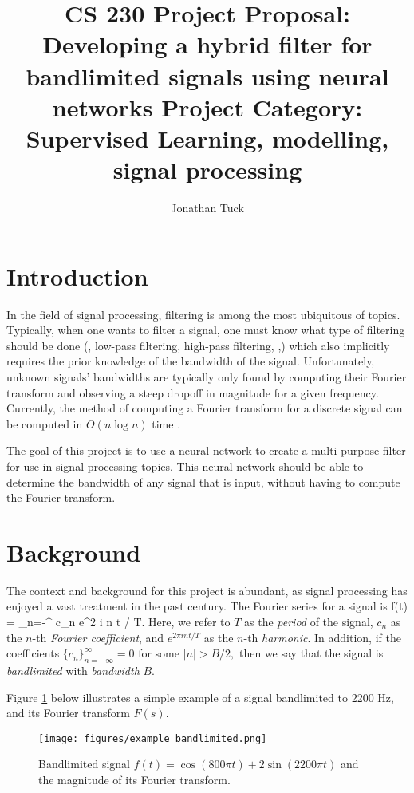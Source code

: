 \documentclass[12pt]{article}
\title{
CS 230 Project Proposal: Developing a hybrid filter for bandlimited signals using neural networks
\newline 
\newline
Project Category: Supervised Learning, modelling, signal processing
}
\author{Jonathan Tuck}
\begin{document}
\maketitle

\newpage
\tableofcontents
\newpage

\section{Introduction}
In the field of signal processing, filtering is among the most ubiquitous of topics.
Typically, when one wants to filter a signal, one must know what type of filtering should be done
(\ie, low-pass filtering, high-pass filtering, \etc,) which also implicitly
requires the prior knowledge of the bandwidth of the signal. Unfortunately, unknown
signals' bandwidths are typically only found by computing their Fourier transform and observing
a steep dropoff in magnitude for a given frequency. Currently, the method of computing a Fourier transform
for a discrete signal can be computed in $O(n \log n)$ time \cite{B:78,O:17}.

The goal of this project is to use a neural network to create a multi-purpose filter for use in
signal processing topics. This neural network should be able to determine the bandwidth of any signal
that is input, without having to compute the Fourier transform.

\section{Background}
The context and background for this project is abundant, as signal processing has enjoyed a vast treatment
in the past century. The Fourier series for a signal \cite{B:78,O:17} is
\BEQ
f(t) = \sum_{n=-\infty}^{\infty} c_n e^{2 \pi i n t / T}.
\EEQ
Here, we refer to $T$ as the \textit{period} of the signal, $c_n$ as the $n$-th 
\textit{Fourier coefficient}, and $e^{2 \pi i n t / T}$ as the $n$-th \textit{harmonic}.
In addition, if the coefficients 
$\{c_n\}_{n=-\infty}^{\infty} = 0$ for some $|n| > B/2,$ then we say that the signal is 
\textit{bandlimited} with \textit{bandwidth} $B.$

Figure \ref{f-example_bandlimited} below illustrates a simple example of a signal bandlimited to 2200 Hz,
and its Fourier transform $F(s).$

\begin{figure}[ht]
\begin{center}
\texttt{[image: figures/example\_bandlimited.png]}
\end{center}
\caption{Bandlimited signal $f(t) = \cos(800 \pi t) + 2\sin(2200 \pi t)$ and the magnitude of its Fourier transform.}
\label{f-example_bandlimited}
\end{figure}
\end{document}
